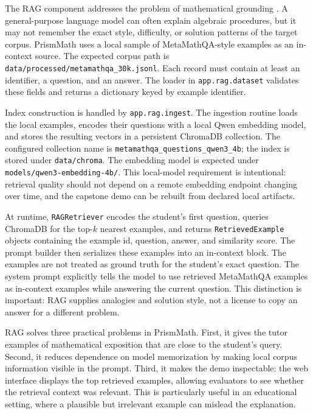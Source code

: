 The RAG component addresses the problem of mathematical grounding \citep{lewis2020rag}. A general-purpose language model can often explain algebraic procedures, but it may not remember the exact style, difficulty, or solution patterns of the target corpus. PrismMath uses a local sample of MetaMathQA-style examples as an in-context source. The expected corpus path is \texttt{data/processed/metamathqa\_30k.jsonl}. Each record must contain at least an identifier, a question, and an answer. The loader in \texttt{app.rag.dataset} validates these fields and returns a dictionary keyed by example identifier.

Index construction is handled by \texttt{app.rag.ingest}. The ingestion routine loads the local examples, encodes their questions with a local Qwen embedding model, and stores the resulting vectors in a persistent ChromaDB collection. The configured collection name is \texttt{metamathqa\_questions\_qwen3\_4b}; the index is stored under \texttt{data/chroma}. The embedding model is expected under \texttt{models/qwen3-embedding-4b/}. This local-model requirement is intentional: retrieval quality should not depend on a remote embedding endpoint changing over time, and the capstone demo can be rebuilt from declared local artifacts.

At runtime, \texttt{RAGRetriever} encodes the student's first question, queries ChromaDB for the top-$k$ nearest examples, and returns \texttt{RetrievedExample} objects containing the example id, question, answer, and similarity score. The prompt builder then serializes these examples into an in-context block. The examples are not treated as ground truth for the student's exact question. The system prompt explicitly tells the model to use retrieved MetaMathQA examples as in-context examples while answering the current question. This distinction is important: RAG supplies analogies and solution style, not a license to copy an answer for a different problem.

RAG solves three practical problems in PrismMath. First, it gives the tutor examples of mathematical exposition that are close to the student's query. Second, it reduces dependence on model memorization by making local corpus information visible in the prompt. Third, it makes the demo inspectable: the web interface displays the top retrieved examples, allowing evaluators to see whether the retrieval context was relevant. This is particularly useful in an educational setting, where a plausible but irrelevant example can mislead the explanation.

